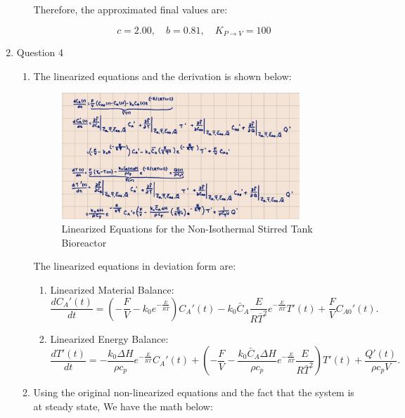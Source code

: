 \documentclass[12pt]{article}
\begin{document}
\begin{enumerate}
\begin{enumerate}
    Therefore, the approximated final values are:
    
    \[
    c = 2.00, \quad b = 0.81, \quad K_{P \to V} = 100
    \]

  \end{enumerate}

  \pagebreak

  \item Question 4
    \begin{enumerate}
    \item
    The linearized equations and the derivation is shown below:

    \begin{figure}[H]
      \centering
      \includegraphics[width=0.9\textwidth]{Figures/handcalc/figure4-1.png}
      \caption{Linearized Equations for the Non-Isothermal Stirred Tank Bioreactor}
      \label{fig:figure41}
    \end{figure}

    The linearized equations in deviation form are:
    \begin{enumerate}
      \item Linearized Material Balance:
        \[
        \frac{dC_A'(t)}{dt} = \left( - \frac{F}{V} - k_0 e^{-\frac{E}{R\bar{T}}} \right) C_A'(t) - k_0 \bar{C}_A \frac{E}{R\bar{T}^2} e^{-\frac{E}{R\bar{T}}} T'(t) + \frac{F}{V} C_{A0}'(t).
        \]
      \item Linearized Energy Balance:
        \[  
        \frac{dT'(t)}{dt} = - \frac{k_0 \Delta H}{\rho c_p} e^{-\frac{E}{R\bar{T}}} C_A'(t) + \left( -\frac{F}{V} - \frac{k_0 \bar{C}_A \Delta H}{\rho c_p} e^{-\frac{E}{R\bar{T}}} \frac{E}{R\bar{T}^2} \right) T'(t) + \frac{Q'(t)}{\rho c_p V}.
        \]
    \end{enumerate}    

    \item
    Using the original non-linearized equations and the fact that the system is at steady state, We have the math below:


\end{enumerate}
\end{enumerate}
\end{document}
